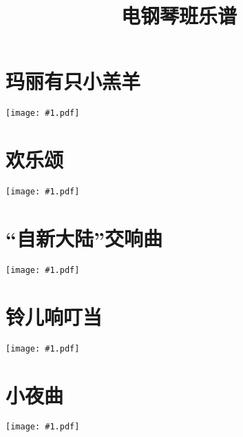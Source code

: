 \documentclass[a4paper,12pt,fontset=none]{ctexart}
\title{\bfseries 电钢琴班乐谱}
\author{}
\date{}
\newcommand{\includescore}[1]{\begin{center}\texttt{[image: \#1.pdf]}\end{center}}
\begin{document}
\pagestyle{plain}

\maketitle

\thispagestyle{plain}

\section{玛丽有只小羔羊}

\includescore{mary-had-a-little-lamb}

\section{欢乐颂}

\includescore{ode-to-joy}

\section{“自新大陆”交响曲}

\includescore{from-the-new-world}

\section{铃儿响叮当}

\includescore{jingle-bells}

\section{小夜曲}

\includescore{serenade}
\end{document}
